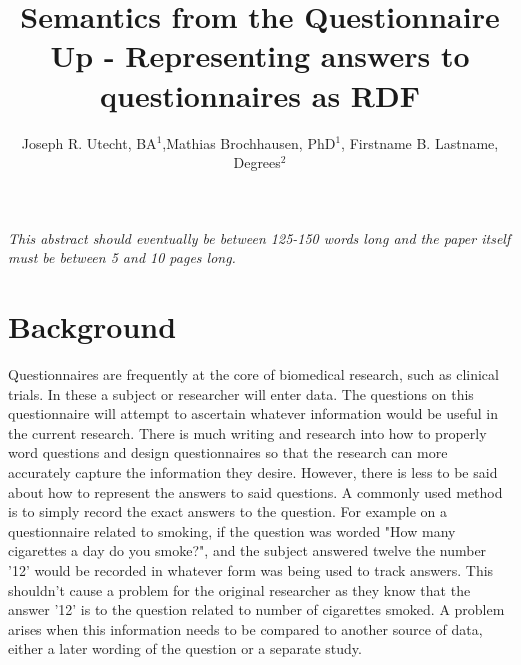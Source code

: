 \documentclass{amia}
\begin{document}
\title{Semantics from the Questionnaire Up - Representing answers to questionnaires as RDF }

\author{Joseph R. Utecht, BA$^{1}$,Mathias Brochhausen, PhD$^{1}$, Firstname B. Lastname, Degrees$^{2}$}


\maketitle


\textit{This abstract should eventually be between 125-150 words long and the paper itself must be between 5 and 10 pages long.}

\section*{Background}
Questionnaires are frequently at the core of biomedical research, such as clinical trials. In these a subject or researcher will enter data.
The questions on this questionnaire will attempt to ascertain whatever information would be useful in the current research.
There is much writing and research into how to properly word questions and design questionnaires so that the research can more accurately capture the information they desire.
However, there is less to be said about how to represent the answers to said questions.
A commonly used method is to simply record the exact answers to the question.
For example on a questionnaire related to smoking, if the question was worded "How many cigarettes a day do you smoke?", and the subject answered twelve the number '12' would be recorded in whatever form was being used to track answers.
This shouldn't cause a problem for the original researcher as they know that the answer '12' is to the question related to number of cigarettes smoked.
A problem arises when this information needs to be compared to another source of data, either a later wording of the question or a separate study.
\end{document}

